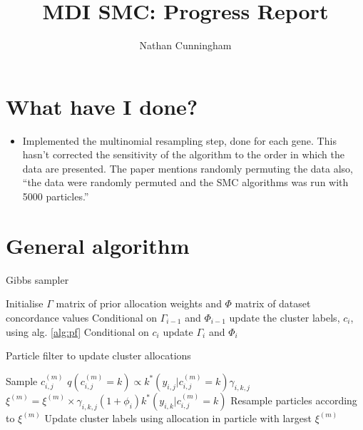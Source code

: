 \documentclass[10pt,a4paper]{article}
\author{Nathan Cunningham}
\title{MDI SMC: Progress Report}
\begin{document}
\maketitle


\section{What have I done?}
\begin{itemize}
\item Implemented the multinomial resampling step, done for each gene. This hasn't corrected the sensitivity of the algorithm to the order in which the data are presented. The \citeauthor{griffin2014sequential} \cite{griffin2014sequential} paper mentions randomly permuting the data also, ``the data were randomly permuted and the SMC algorithms was run with 5000 particles.''
\end{itemize}




\section*{General algorithm}
\begin{algorithm}
\caption{Gibbs sampler}
 \begin{algorithmic}[1]
  \State Initialise $\Gamma$ matrix of prior allocation weights and $\Phi$ matrix of dataset concordance values
  \State Conditional on $\Gamma_{i-1}$ and $\Phi_{i-1}$ update the cluster labels, $c_{i}$, using alg. \ref{alg:pf}
  \State Conditional on $c_{i}$ update $\Gamma_i$ and $\Phi_i$
  \EndFor
\end{algorithmic}
\end{algorithm}


\begin{algorithm}
\caption{Particle filter to update cluster allocations}
\label{alg:pf}
 \begin{algorithmic}[1]
   
   
   
  \State Sample $c^{(m)}_{i, j}$ 
  \State $q(c^{(m)}_{i,j} = k) \propto k^*(y_{i,j}|c_{i,j}^{(m)} = k) \gamma_{i, k, j}$ 
  \State $\xi^{(m)} =  \xi^{(m)} \times \gamma_{i, k, j}(1+\phi_{i})k^*(y_{i,k}|c_{i,j}^{(m)} = k)$ 
  \EndFor
  \EndFor
  \State Resample particles according to $\xi^{(m)}$
  \EndFor
  \State Update cluster labels using allocation in particle with largest $\xi^{(m)}$

\end{algorithmic}
\end{algorithm}
\end{document}
